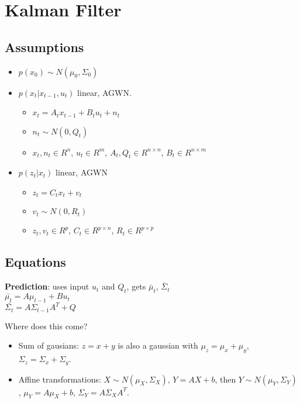 \section{Kalman Filter}
\subsection*{Assumptions}
\begin{itemize}
  \item $p(x_0) \sim N(\mu_0, \Sigma_0)$
  \item $p(x_t|x_{t-1}, u_t)$ linear, AGWN.
    \begin{itemize}
      \item $x_t = A_t x_{t-1} + B_t u_t + n_t$
      \item $n_t \sim N(0, Q_t)$
      \item $x_t, n_t \in R^n$, $u_t \in R^m$, 
        $A_t, Q_t \in R^{n\times n}$, $B_t \in R^{n \times m}$
    \end{itemize}
  \item $p(z_t|x_t)$ linear, AGWN
    \begin{itemize}
      \item $z_t = C_t x_t + v_t$
      \item $v_t \sim N(0, R_t)$
      \item $z_t, v_t \in R^p$, $C_t \in R^{p \times n}$, $R_t \in R^{p
        \times p}$
    \end{itemize}
\end{itemize}

\subsection*{Equations}
\textbf{Prediction}: uses input $u_t$ and $Q_t$, gets $\bar{\mu}_t$,
$\bar{\Sigma}_t$\\
$\bar{\mu_t} = A \mu_{t-1} + B u_t$ \\
$\bar{\Sigma_t} = A \Sigma_{t-1} A^T + Q$

Where does this come?
\begin{itemize}
  \item Sum of gausians: $z = x + y$ is also a gaussian with $\mu_z =
    \mu_x + \mu_y$, $\Sigma_z = \Sigma_x + \Sigma_y$.
  \item Affine transformations: $X \sim N(\mu_X, \Sigma_X)$, $Y= AX +
    b$, then $Y \sim N(\mu_Y, \Sigma_Y)$, $\mu_Y = A \mu_X + b$,
    $\Sigma_Y = A \Sigma_X A^T$.
\end{itemize}


